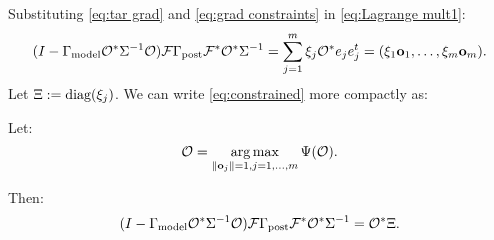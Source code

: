 
Substituting \eqref{eq:tar grad} and \eqref{eq:grad constraints} in
\eqref{eq:Lagrange mult1}:
\begin{equation}\label{eq:constrained}
  (I - \modcov \obs^* \Sigma^{-1} \obs) \fwd \postcov \fwd^* \obs^*\Sigma^{-1}
  = \sum_{j=1}^m \xi_j \obs^* e_je_j^t = (\xi_1 \meas_1,\dots,\xi_m \meas_m).
\end{equation}
Let $\Xi := \textup{diag}(\xi_j)$. We can write \eqref{eq:constrained} more
compactly as:

\begin{theorem}\label{thm:constrained}
  Let:
  \begin{equation*}
    \obs = \argmax_{\|\meas_j\| = 1, j=1,\dots,m}\tar(\obs).
  \end{equation*}
  
  Then:
  \begin{equation*}
    ( I - \modcov \obs^* \Sigma^{-1} \obs) \fwd \postcov \fwd^* \obs^*  \Sigma^{-1}
    = \obs^* \Xi.
  \end{equation*}
\end{theorem}




